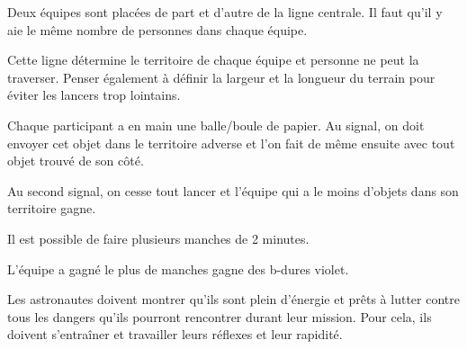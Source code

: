 \documentclass{grand-jeu}
\begin{document}
\begin{liste-materiel}
\end{liste-materiel}

\begin{regles}
Deux équipes sont placées de part et d’autre de la ligne centrale. Il faut qu'il y aie le même nombre de personnes dans chaque équipe. 

Cette ligne détermine le territoire de chaque équipe et personne ne peut la traverser. Penser également à définir la largeur et la longueur du terrain pour éviter les lancers trop lointains.

Chaque participant a en main une balle/boule de papier. Au signal, on doit envoyer cet objet dans le territoire adverse et l’on fait de même ensuite avec tout objet trouvé de son côté. 

Au second signal, on cesse tout lancer et l’équipe qui a le moins d’objets dans son territoire gagne.

Il est possible de faire plusieurs manches de 2 minutes.

L’équipe a gagné le plus de manches gagne des b-dures violet. 
\end{regles}

\begin{imaginaire}
Les astronautes doivent montrer qu'ils sont plein d'énergie et prêts à lutter contre tous les dangers qu'ils pourront rencontrer durant leur mission. Pour cela, ils doivent s'entraîner et travailler leurs réflexes et leur rapidité.
\end{imaginaire}

\begin{moments-stop}
\end{moments-stop}
\end{document}
